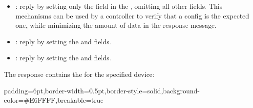 \documentclass[11pt]{article}
\begin{document}
{\begin{itemize}
\item{}
: reply by setting only the  field in the
, omitting all other fields. This mechanisms can be
used by a controller to verify that a config is the expected one, while
minimizing the amount of data in the response message.%

\item{}
: reply by setting the  and  fields.%

\item{}
: reply by setting the  and
 fields.%
\end{itemize}%

\noindent{}The response contains the  for the specified device:%

\begin{mdbmargintb}{6pt}{6pt}%
\begin{mdblock}{padding=6pt,border-width=0.5pt,border-style=solid,background-color=\#E6FFFF,breakable=true}%
\begin{mdpre}%
\end{mdpre}%
\end{mdblock}%
\end{mdbmargintb}%

}
\end{document}
